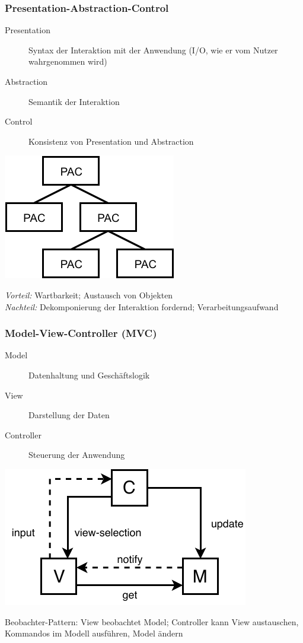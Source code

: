 \documentclass
[
	8pt,		%
	ngerman,	%
	a4paper,	%
	landscape,	%
	final		%
]{extarticle}
\begin{document}
\begin{multicols*}{4}
	\subsubsection{Presentation-Abstraction-Control}
	\begin{description}
		\item[Presentation] Syntax der Interaktion mit der Anwendung
		      (I/O, wie er vom Nutzer wahrgenommen wird)
		\item[Abstraction] Semantik der Interaktion
		\item[Control]  Konsistenz von Presentation und Abstraction
	\end{description}
	\begin{center}
		\includegraphics[width=0.5\linewidth]{./pictures/pac.pdf}
	\end{center}
	\textit{Vorteil:} Wartbarkeit; Austausch von Objekten \\
	\textit{Nachteil:} Dekomponierung der Interaktion fordernd;
	Verarbeitungsaufwand
	\subsubsection{Model-View-Controller (MVC)}
	\begin{description}
		\item[Model] Datenhaltung und Geschäftslogik
		\item[View] Darstellung der Daten
		\item[Controller] Steuerung der Anwendung
	\end{description}
	\begin{center}
		\includegraphics[width=0.7\linewidth]{./pictures/mvc.pdf}
	\end{center}
	Beobachter-Pattern: View beobachtet Model; Controller kann View austauschen,
	Kommandos im Modell ausführen, Model ändern

\end{multicols*}
\end{document}
